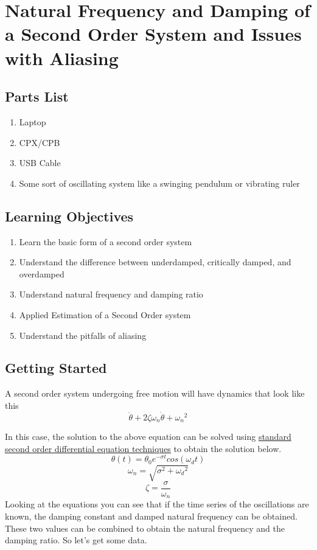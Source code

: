 \newpage

\section{Natural Frequency and Damping of a Second Order System and Issues with Aliasing}
\label{s:pendulum}

\subsection{Parts List}

\begin{enumerate}[itemsep=-5pt]
\item Laptop
\item CPX/CPB
\item USB Cable
\item Some sort of oscillating system like a swinging pendulum or vibrating ruler
\end{enumerate}

\subsection{Learning Objectives}
\begin{enumerate}[itemsep=-5pt]
\item Learn the basic form of a second order system
\item Understand the difference between underdamped, critically damped, and overdamped
\item Understand natural frequency and damping ratio
\item Applied Estimation of a Second Order system
\item Understand the pitfalls of aliasing
\end{enumerate}

\subsection{Getting Started}
A second order system undergoing free motion will have dynamics that look like this
\begin{equation}
\ddot{\theta} + 2\zeta \omega_n \dot{\theta} + {\omega_n}^2
\end{equation}

In this case, the solution to the above equation can be solved using \href{https://www.youtube.com/watch?v=VOv2HI3i7oo}{standard second order differential equation techniques} to obtain the solution below.
\begin{equation}\label{e:secondorder}
\theta(t) = \theta_0e^{-\sigma t}cos(\omega_d t)
\end{equation}
\begin{equation}
\omega_n = \sqrt{\sigma^2 + {\omega_d}^2}
\end{equation}
\begin{equation}
\zeta = \frac{\sigma}{\omega_n}
\end{equation}
Looking at the equations you can see that if the time series of the oscillations are known, the damping constant and damped natural frequency can be obtained. These two values can be combined to obtain the natural frequency and the damping ratio. So let’s get some data. 

